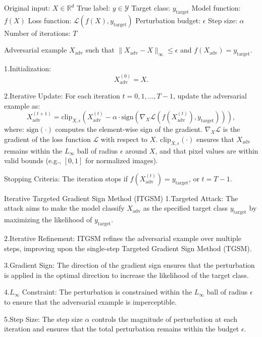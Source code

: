 Original input: $X \in \mathbb{R}^d$
True label: $y \in \mathcal{Y}$
Target class: $y_{\text{target}}$
Model function: $f(X)$
Loss function: $\mathcal{L}(f(X), y_{\text{target}})$
Perturbation budget: $\epsilon$
Step size: $\alpha$
Number of iterations: $T$


Adversarial example $X_{\text{adv}}$ such that $\|X_{\text{adv}} - X\|_\infty \leq \epsilon$ and $f(X_{\text{adv}}) = y_{\text{target}}$.

1.Initialization:
   \[
   X^{(0)}_{\text{adv}} = X.
   \]

2.Iterative Update:
   For each iteration $t = 0, 1, \dots, T-1$, update the adversarial example as:
   \[
   X^{(t+1)}_{\text{adv}} = \text{clip}_{X, \epsilon} \left( X^{(t)}_{\text{adv}} - \alpha \cdot \text{sign} \left( \nabla_X \mathcal{L}(f(X^{(t)}_{\text{adv}}), y_{\text{target}}) \right) \right),
   \]
where:
$\text{sign}(\cdot)$ computes the element-wise sign of the gradient.
$\nabla_X \mathcal{L}$ is the gradient of the loss function $\mathcal{L}$ with respect to $X$.
$\text{clip}_{X, \epsilon}(\cdot)$ ensures that $X_{\text{adv}}$ remains within the $L_\infty$ ball of radius $\epsilon$ around $X$, and that pixel values are within valid bounds (e.g., $[0, 1]$ for normalized images).

Stopping Criteria: The iteration stops if $f(X^{(t)}_{\text{adv}}) = y_{\text{target}}$, or $t = T-1$.


Iterative Targeted Gradient Sign Method (ITGSM)
1.Targeted Attack: The attack aims to make the model classify $X_{\text{adv}}$ as the specified target class $y_{\text{target}}$ by maximizing the likelihood of $y_{\text{target}}$.

2.Iterative Refinement: ITGSM refines the adversarial example over multiple steps, improving upon the single-step Targeted Gradient Sign Method (TGSM).

3.Gradient Sign: The direction of the gradient sign ensures that the perturbation is applied in the optimal direction to increase the likelihood of the target class.

4.$L_\infty$ Constraint: The perturbation is constrained within the $L_\infty$ ball of radius $\epsilon$ to ensure that the adversarial example is imperceptible.

5.Step Size: The step size $\alpha$ controls the magnitude of perturbation at each iteration and ensures that the total perturbation remains within the budget $\epsilon$.
